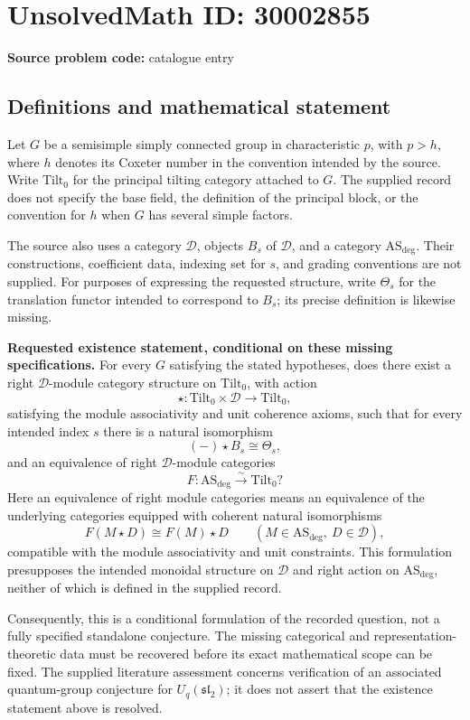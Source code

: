 \documentclass[11pt]{article}
\begin{document}
\section*{UnsolvedMath ID: 30002855}
\textbf{Source problem code:} catalogue entry
\subsection{Definitions and mathematical statement}
Let \(G\) be a semisimple simply connected group in characteristic \(p\), with \(p>h\), where \(h\) denotes its Coxeter number in the convention intended by the source. Write \(\mathrm{Tilt}_0\) for the principal tilting category attached to \(G\). The supplied record does not specify the base field, the definition of the principal block, or the convention for \(h\) when \(G\) has several simple factors.

The source also uses a category \(\mathcal D\), objects \(B_s\) of \(\mathcal D\), and a category \(\mathrm{AS}_{\mathrm{deg}}\). Their constructions, coefficient data, indexing set for \(s\), and grading conventions are not supplied. For purposes of expressing the requested structure, write \(\Theta_s\) for the translation functor intended to correspond to \(B_s\); its precise definition is likewise missing.

\textbf{Requested existence statement, conditional on these missing specifications.} For every \(G\) satisfying the stated hypotheses, does there exist a right \(\mathcal D\)-module category structure on \(\mathrm{Tilt}_0\), with action
\[
\star:\mathrm{Tilt}_0\times\mathcal D\longrightarrow\mathrm{Tilt}_0,
\]
satisfying the module associativity and unit coherence axioms, such that for every intended index \(s\) there is a natural isomorphism
\[
(-)\star B_s\cong\Theta_s,
\]
and an equivalence of right \(\mathcal D\)-module categories
\[
F:\mathrm{AS}_{\mathrm{deg}}\xrightarrow{\sim}\mathrm{Tilt}_0?
\]
Here an equivalence of right module categories means an equivalence of the underlying categories equipped with coherent natural isomorphisms
\[
F(M\star D)\cong F(M)\star D
\qquad
(M\in\mathrm{AS}_{\mathrm{deg}},\ D\in\mathcal D),
\]
compatible with the module associativity and unit constraints. This formulation presupposes the intended monoidal structure on \(\mathcal D\) and right action on \(\mathrm{AS}_{\mathrm{deg}}\), neither of which is defined in the supplied record.

Consequently, this is a conditional formulation of the recorded question, not a fully specified standalone conjecture. The missing categorical and representation-theoretic data must be recovered before its exact mathematical scope can be fixed. The supplied literature assessment concerns verification of an associated quantum-group conjecture for \(U_q(\mathfrak{sl}_2)\); it does not assert that the existence statement above is resolved.
\end{document}
